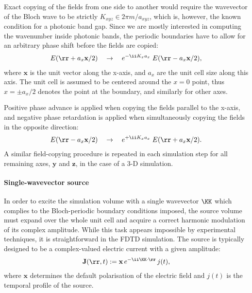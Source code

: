 Exact copying of the fields from one side to another would require the wavevector of the Bloch wave to be strictly $K_{xyz} \in 2\pi m/a_{xyz}$, which is, however, the known condition for a photonic band gap. Since we are mostly interested in computing the wavenumber inside photonic bands, the periodic boundaries have to allow for an arbitrary phase shift before the fields are copied:
\begin{equation} E(\rr + a_x\mathbf{x}/2) \quad\rightarrow\quad  e^{-\ii K_x a_x}\; E( \rr - a_x\mathbf{x}/2), \label{eq_phaseshiftp}\end{equation}
	where $\mathbf{x}$ is the unit vector along the x-axis, and $a_x$ are the unit cell size along this axis. The unit cell is assumed to be centered around the $x=0$ point, thus $x=\pm a_x/2$ denotes the point at the boundary, and similarly for other axes.

Positive phase advance is applied when copying the fields parallel to the x-axis, and negative phase retardation is applied when simultaneously copying the fields in the opposite direction:
\begin{equation} E(\rr - a_x\mathbf{x}/2)  \quad\rightarrow\quad  e^{+\ii K_x a_x}\; E(\rr + a_x\mathbf{x}/2). \label{eq_phaseshiftn}\end{equation}
A similar field-copying procedure is repeated in each simulation step for all remaining axes, $\mathbf{y}$ and $\mathbf{z}$, in the case of a 3-D simulation. 

\paragraph{Single-wavevector source}%
In order to excite the simulation volume with a single wavevector $\KK$ which complies to the Bloch-periodic boundary conditions imposed, the source volume must expand over the whole unit cell and acquire a correct harmonic modulation of its complex amplitude. While this task appears impossible by experimental techniques, it is straightforward in the FDTD simulation. The source is typically designed to be a complex-valued electric current with a given amplitude:
\begin{equation} \mathbf{J}(\rr, t) := \mathbf{x} \, e^{-\ii \KK\cdot \rr} \,j(t), \label{eq_}\end{equation}
	where $\mathbf{x}$ determines the default polarisation of the electric field and $j(t)$ is the temporal profile of the source.

